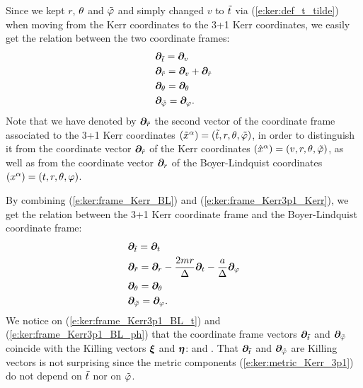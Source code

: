 Since we kept $r$, $\theta$ and ${\tilde\varphi}$ and simply changed
$v$ to ${\tilde t}$ via (\ref{e:ker:def_t_tilde}) when moving from the Kerr
coordinates to the 3+1 Kerr coordinates, we easily get the relation
between the two coordinate frames:
\begin{subequations}
\label{e:ker:frame_Kerr3p1_Kerr}
\begin{align}
    & \bm{\partial}_{\tilde t} = \bm{\partial}_v \\
    & \bm{\partial}_{\tilde r} = \bm{\partial}_v + \bm{\partial}_{\hat{r}} \\
    & \bm{\partial}_\theta = \bm{\partial}_\theta \\
    & \bm{\partial}_{\tilde\varphi} = \bm{\partial}_\varphi .
\end{align}
\end{subequations}
Note that we have denoted by $\bm{\partial}_{\tilde r}$ the second vector of the
coordinate frame associated to the 3+1 Kerr coordinates
$(\tilde{x}^\alpha) = ({\tilde t}, r, \theta,{\tilde\varphi})$, in order to distinguish it from
the coordinate vector $\bm{\partial}_{\hat r}$ of the Kerr coordinates
$(\hat{x}^\alpha) = (v, r, \theta,{\tilde\varphi})$, as well as from the coordinate vector
$\bm{\partial}_r$ of the Boyer-Lindquist coordinates
$(x^\alpha) = (t,r,\theta,\varphi)$.

By combining (\ref{e:ker:frame_Kerr_BL}) and (\ref{e:ker:frame_Kerr3p1_Kerr}),
we get the relation between the 3+1 Kerr coordinate frame and the
Boyer-Lindquist coordinate frame:
\begin{subequations}
\label{e:ker:frame_Kerr3p1_BL}
\begin{align}
    & \bm{\partial}_{\tilde t} = \bm{\partial}_t \label{e:ker:frame_Kerr3p1_BL_t} \\
    & \bm{\partial}_{\tilde r} = \bm{\partial}_r - \frac{2mr}{\Delta} \bm{\partial}_t
                        - \frac{a}{\Delta} \bm{\partial}_\varphi \\
    & \bm{\partial}_\theta = \bm{\partial}_\theta \\
    & \bm{\partial}_{{\tilde\varphi}} = \bm{\partial}_\varphi . \label{e:ker:frame_Kerr3p1_BL_ph}
\end{align}
\end{subequations}
We notice on (\ref{e:ker:frame_Kerr3p1_BL_t}) and (\ref{e:ker:frame_Kerr3p1_BL_ph})
that the coordinate frame vectors $\bm{\partial}_{\tilde t}$ and $\bm{\partial}_{\tilde\varphi}$
coincide with the Killing vectors $\bm{\xi}$ and $\bm{\eta}$:
\be \label{e:ker:Killing_vec_3p1}
    \encadre{\wpar_\ti = \w{\xi}} \quad \mbox{and} \quad
    \encadre{\wpar_\tph = \w{\eta}} .
\ee
That $\bm{\partial}_{\tilde t}$ and $\bm{\partial}_{\tilde\varphi}$ are Killing vectors is not surprising since
the metric components (\ref{e:ker:metric_Kerr_3p1}) do not depend on ${\tilde t}$
nor on ${\tilde\varphi}$.

